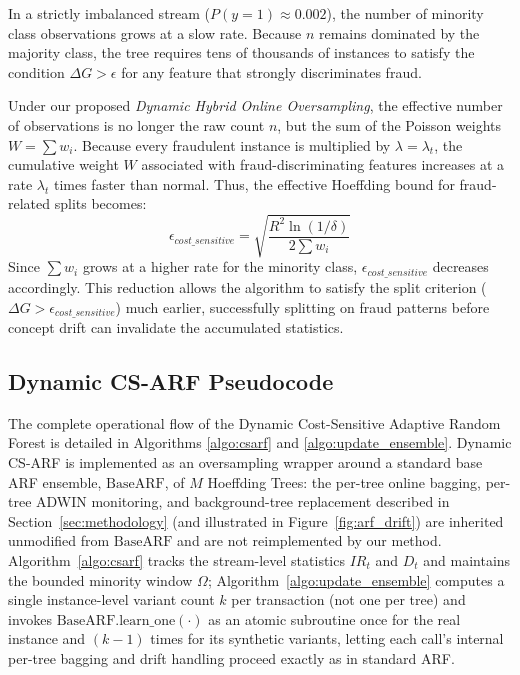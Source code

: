 \documentclass[review,12pt]{elsarticle}
\begin{document}
In a strictly imbalanced stream ($P(y=1) \approx 0.002$), the number of minority class observations grows at a slow rate. Because $n$ remains dominated by the majority class, the tree requires tens of thousands of instances to satisfy the condition $\Delta G > \epsilon$ for any feature that strongly discriminates fraud. 

Under our proposed \textit{Dynamic Hybrid Online Oversampling}, the effective number of observations is no longer the raw count $n$, but the sum of the Poisson weights $W = \sum w_i$. Because every fraudulent instance is multiplied by $\lambda = \lambda_t$, the cumulative weight $W$ associated with fraud-discriminating features increases at a rate $\lambda_t$ times faster than normal. Thus, the effective Hoeffding bound for fraud-related splits becomes:
\begin{equation}
    \epsilon_{cost\_sensitive} = \sqrt{\frac{R^2 \ln(1/\delta)}{2 \sum w_i}}
\end{equation}
Since $\sum w_i$ grows at a higher rate for the minority class, $\epsilon_{cost\_sensitive}$ decreases accordingly. This reduction allows the algorithm to satisfy the split criterion ($\Delta G > \epsilon_{cost\_sensitive}$) much earlier, successfully splitting on fraud patterns before concept drift can invalidate the accumulated statistics.

\subsection{Dynamic CS-ARF Pseudocode}
The complete operational flow of the Dynamic Cost-Sensitive Adaptive Random Forest is detailed in Algorithms \ref{algo:csarf} and \ref{algo:update_ensemble}. Dynamic CS-ARF is implemented as an oversampling wrapper around a standard base ARF ensemble, $\text{BaseARF}$, of $M$ Hoeffding Trees: the per-tree online bagging, per-tree ADWIN monitoring, and background-tree replacement described in Section~\ref{sec:methodology} (and illustrated in Figure~\ref{fig:arf_drift}) are inherited unmodified from $\text{BaseARF}$ and are not reimplemented by our method. Algorithm~\ref{algo:csarf} tracks the stream-level statistics $IR_t$ and $D_t$ and maintains the bounded minority window $\Omega$; Algorithm~\ref{algo:update_ensemble} computes a single instance-level variant count $k$ per transaction (not one per tree) and invokes $\text{BaseARF.learn\_one}(\cdot)$ as an atomic subroutine once for the real instance and $(k-1)$ times for its synthetic variants, letting each call's internal per-tree bagging and drift handling proceed exactly as in standard ARF.
\end{document}
